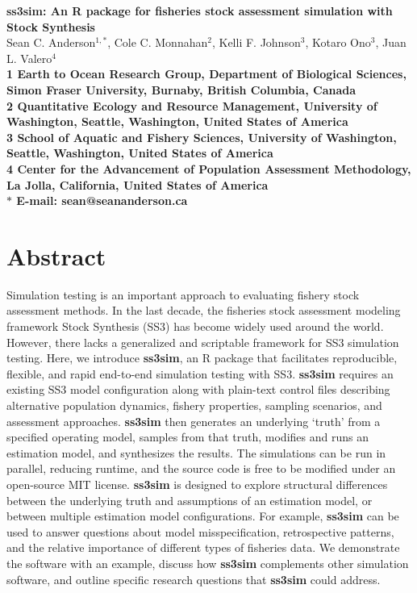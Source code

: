 \documentclass[10pt]{article}
\date{}
\begin{document}
\begin{flushleft}
{\Large
\textbf{ss3sim: An \textsf{R} package for fisheries stock assessment simulation with Stock Synthesis}
}
\\
Sean C. Anderson$^{1,\ast}$,
Cole C. Monnahan$^{2}$,
Kelli F. Johnson$^{3}$,
Kotaro Ono$^{3}$,
Juan L. Valero$^{4}$
\\
\bf{1} Earth to Ocean Research Group,
Department of Biological Sciences,
Simon Fraser University,
Burnaby, British Columbia, Canada
\\
\bf{2} Quantitative Ecology and Resource Management,
University of Washington,
Seattle, Washington, United States of America
\\
\bf{3} School of Aquatic and Fishery Sciences,
University of Washington,
Seattle, Washington, United States of America
\\
\bf{4} Center for the Advancement of Population Assessment Methodology,
La Jolla, California, United States of America
\\
$\ast$ E-mail: sean@seananderson.ca
\end{flushleft}



%
\section*{Abstract}

Simulation testing is an important approach to evaluating fishery stock
assessment methods. In the last decade, the fisheries stock assessment modeling
framework Stock Synthesis (SS3) has become widely used around the world.
However, there lacks a generalized and scriptable framework for SS3 simulation
testing. Here, we introduce \textbf{ss3sim}, an \textsf{R} package that
facilitates reproducible, flexible, and rapid end-to-end simulation
testing with SS3. \textbf{ss3sim} requires an existing SS3 model configuration
along with plain-text control files describing alternative population dynamics,
fishery properties, sampling scenarios, and assessment approaches.
\textbf{ss3sim} then generates an underlying `truth' from a specified
operating model, samples from that truth, modifies and runs an estimation
model, and synthesizes the results. The simulations can be run in parallel,
reducing runtime, and the source code is free to be modified under an
open-source MIT license. \textbf{ss3sim} is designed to explore structural
differences between the underlying truth and assumptions of an estimation
model, or between multiple estimation model configurations. For example,
\textbf{ss3sim} can be used to answer questions about model misspecification,
retrospective patterns, and the relative importance of different types of
fisheries data. We demonstrate the software with an example, discuss how
\textbf{ss3sim} complements other simulation software, and outline specific
research questions that \textbf{ss3sim} could address.
\end{document}
